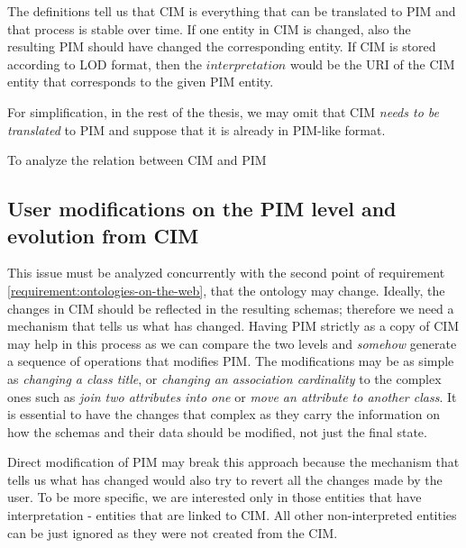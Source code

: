 \smallskip



The definitions tell us that CIM is everything that can be translated to PIM and that process is stable over time. If one entity in CIM is changed, also the resulting PIM should have changed the corresponding entity. If CIM is stored according to LOD format, then the $interpretation$ would be the URI of the CIM entity that corresponds to the given PIM entity.

For simplification, in the rest of the thesis, we may omit that CIM \textit{needs to be translated} to PIM and suppose that it is already in PIM-like format.

\bigskip

To analyze the relation between CIM and PIM







\newpage\subsection{User modifications on the PIM level and evolution from CIM}

This issue must be analyzed concurrently with the second point of requirement \ref{requirement:ontologies-on-the-web}, that the ontology may change. Ideally, the changes in CIM should be reflected in the resulting schemas; therefore we need a mechanism that tells us what has changed. Having PIM strictly as a copy of CIM may help in this process as we can compare the two levels and \textit{somehow} generate a sequence of operations that modifies PIM. The modifications may be as simple as \textit{changing a class title}, or \textit{changing an association cardinality} to the complex ones such as \textit{join two attributes into one} or \textit{move an attribute to another class}. It is essential to have the changes that complex as they carry the information on how the schemas and their data should be modified, not just the final state.

Direct modification of PIM may break this approach because the mechanism that tells us what has changed would also try to revert all the changes made by the user. To be more specific, we are interested only in those entities that have interpretation - entities that are linked to CIM. All other non-interpreted entities can be just ignored as they were not created from the CIM.

